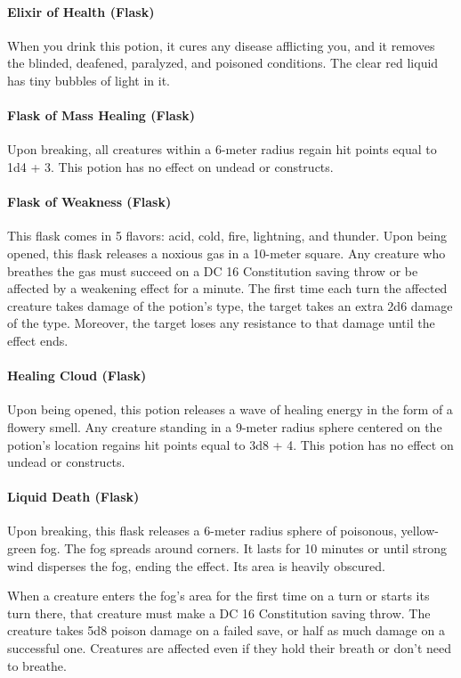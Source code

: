     \paragraph{Elixir of Health (Flask)}
        When you drink this potion, it cures any disease afflicting you, and it removes the blinded, deafened, paralyzed, and poisoned conditions.
        The clear red liquid has tiny bubbles of light in it.
    \paragraph{Flask of Mass Healing (Flask)} %
        Upon breaking, all creatures within a 6-meter radius regain hit points equal to 1d4 + 3.
        This potion has no effect on undead or constructs.
    \paragraph{Flask of Weakness (Flask)} %
        This flask comes in 5 flavors: acid, cold, fire, lightning, and thunder.
        Upon being opened, this flask releases a noxious gas in a 10-meter square.
        Any creature who breathes the gas must succeed on a DC 16 Constitution saving throw or be affected by a weakening effect for a minute.
        The first time each turn the affected creature takes damage of the potion's type, the target takes an extra 2d6 damage of the type.
        Moreover, the target loses any resistance to that damage until the effect ends.
    \paragraph{Healing Cloud (Flask)} %
        Upon being opened, this potion releases a wave of healing energy in the form of a flowery smell.
        Any creature standing in a 9-meter radius sphere centered on the potion's location regains hit points equal to 3d8 + 4.
        This potion has no effect on undead or constructs.
    \paragraph{Liquid Death (Flask)} %
        Upon breaking, this flask releases a 6-meter radius sphere of poisonous, yellow-green fog.
        The fog spreads around corners.
        It lasts for 10 minutes or until strong wind disperses the fog, ending the effect.
        Its area is heavily obscured.

        When a creature enters the fog's area for the first time on a turn or starts its turn there, that creature must make a DC 16 Constitution saving throw.
        The creature takes 5d8 poison damage on a failed save, or half as much damage on a successful one.
        Creatures are affected even if they hold their breath or don't need to breathe.

